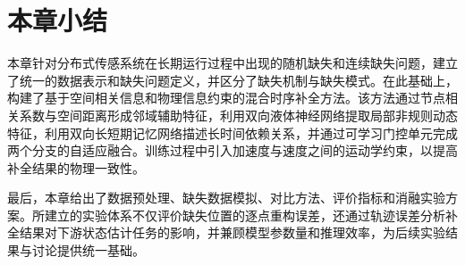 \section{本章小结}

本章针对分布式传感系统在长期运行过程中出现的随机缺失和连续缺失问题，建立了统一的数据表示和缺失问题定义，并区分了缺失机制与缺失模式。在此基础上，构建了基于空间相关信息和物理信息约束的混合时序补全方法。该方法通过节点相关系数与空间距离形成邻域辅助特征，利用双向液体神经网络提取局部非规则动态特征，利用双向长短期记忆网络描述长时间依赖关系，并通过可学习门控单元完成两个分支的自适应融合。训练过程中引入加速度与速度之间的运动学约束，以提高补全结果的物理一致性。

最后，本章给出了数据预处理、缺失数据模拟、对比方法、评价指标和消融实验方案。所建立的实验体系不仅评价缺失位置的逐点重构误差，还通过轨迹误差分析补全结果对下游状态估计任务的影响，并兼顾模型参数量和推理效率，为后续实验结果与讨论提供统一基础。